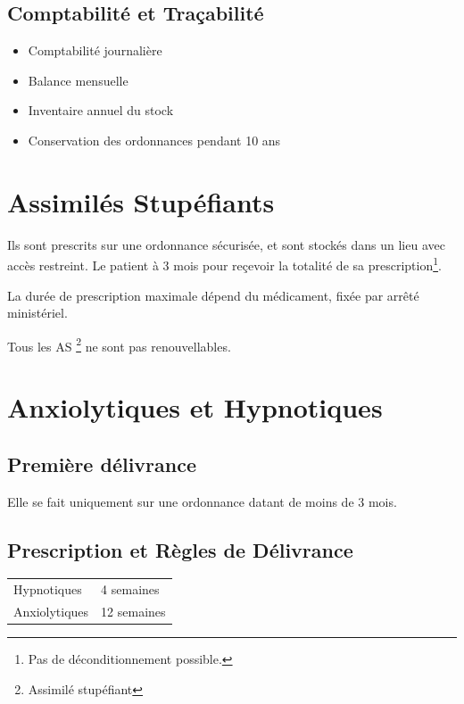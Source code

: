 \documentclass[11pt]{article}
\begin{document}
\subsection{Comptabilité et Traçabilité}
\label{sec:org0c5d62d}
\begin{itemize}
\item Comptabilité journalière
\item Balance mensuelle
\item Inventaire annuel du stock
\item Conservation des ordonnances pendant 10 ans
\end{itemize}

\section{Assimilés Stupéfiants}
\label{sec:org9654a42}
Ils sont prescrits sur une ordonnance sécurisée, et sont stockés dans un lieu avec accès restreint.
Le patient à 3 mois pour reçevoir la totalité de sa prescription\footnote{Pas de déconditionnement possible.}.

La durée de prescription maximale dépend du médicament, fixée par arrêté ministériel.

Tous les AS \footnote{Assimilé stupéfiant} ne sont pas renouvellables.

\section{Anxiolytiques et Hypnotiques}
\label{sec:orgc0c256f}

\subsection{Première délivrance}
\label{sec:orgf91653a}
Elle se fait uniquement sur une ordonnance datant de moins de 3 mois.

\subsection{Prescription et Règles de Délivrance}
\label{sec:org7149e8f}
\begin{center}
\begin{tabular}{ll}
Hypnotiques & 4 semaines\\
Anxiolytiques & 12 semaines\\
\end{tabular}
\end{center}
\end{document}
